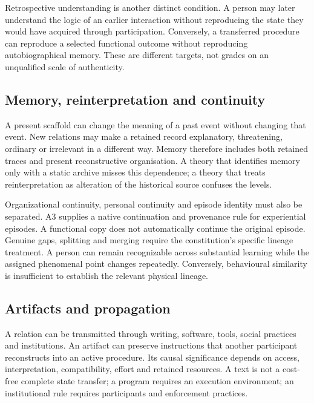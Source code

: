 \documentclass[
  11pt,
  a4paper,
]{article}
\begin{document}
Retrospective understanding is another distinct condition. A person may
later understand the logic of an earlier interaction without reproducing
the state they would have acquired through participation. Conversely, a
transferred procedure can reproduce a selected functional outcome
without reproducing autobiographical memory. These are different
targets, not grades on an unqualified scale of authenticity.

\subsection{Memory, reinterpretation and
continuity}\label{memory-reinterpretation-and-continuity}

A present scaffold can change the meaning of a past event without
changing that event. New relations may make a retained record
explanatory, threatening, ordinary or irrelevant in a different way.
Memory therefore includes both retained traces and present
reconstructive organisation. A theory that identifies memory only with a
static archive misses this dependence; a theory that treats
reinterpretation as alteration of the historical source confuses the
levels.

Organizational continuity, personal continuity and episode identity must
also be separated. A3 supplies a native continuation and provenance rule
for experiential episodes. A functional copy does not automatically
continue the original episode. Genuine gaps, splitting and merging
require the constitution's specific lineage treatment. A person can
remain recognizable across substantial learning while the assigned
phenomenal point changes repeatedly. Conversely, behavioural similarity
is insufficient to establish the relevant physical lineage.

\subsection{Artifacts and propagation}\label{artifacts-and-propagation}

A relation can be transmitted through writing, software, tools, social
practices and institutions. An artifact can preserve instructions that
another participant reconstructs into an active procedure. Its causal
significance depends on access, interpretation, compatibility, effort
and retained resources. A text is not a cost-free complete state
transfer; a program requires an execution environment; an institutional
rule requires participants and enforcement practices.
\end{document}
